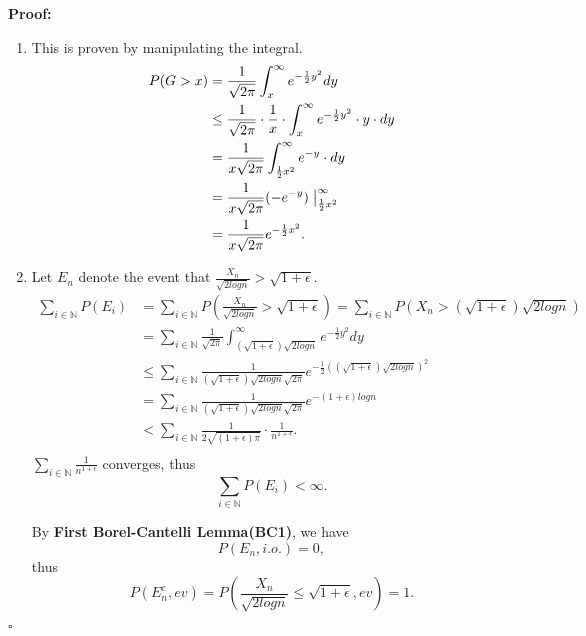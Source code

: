 \documentclass[UTF8, 12pt]{article}
\newenvironment{proof}{\noindent\ignorespaces\textbf{Proof:}}{\hfill $\square$\par\noindent}
\theoremstyle{break}
\begin{document}
    \begin{proof}
        \begin{enumerate}
            \item This is proven by manipulating the integral.
            \begin{align*}
                P(G > x) &= \frac{1}{\sqrt{2\pi}}\int_{x}^{\infty}e^{-\frac{1}{2}y^2}dy \\
                &\leq \frac{1}{\sqrt{2\pi}} \cdot \frac{1}{x} \cdot \int_{x}^{\infty}e^{-\frac{1}{2}y^2}\cdot y \cdot dy \\
                &= \frac{1}{x\sqrt{2\pi}} \int_{\frac{1}{2}x^2}^{\infty}e^{-y}\cdot dy \\
                &= \frac{1}{x\sqrt{2\pi}} (-e^{-y})\bigm|^{\infty}_{\frac{1}{2}x^2} \\
                &= \frac{1}{x\sqrt{2\pi}}e^{-\frac{1}{2}x^2}.
            \end{align*}

            \item Let $E_n$ denote the event that $\frac{X_n}{\sqrt{2logn}} > \sqrt{1 + \epsilon}$.
            \begin{align*}
                \sum_{i \in \mathbb{N}} P(E_i) &= \sum_{i \in \mathbb{N}} P(\frac{X_n}{\sqrt{2logn}} > \sqrt{1 + \epsilon}) = \sum_{i \in \mathbb{N}} P(X_n > (\sqrt{1 + \epsilon})\sqrt{2logn})\\
                &= \sum_{i \in \mathbb{N}} \frac{1}{\sqrt{2\pi}}\int_{ (\sqrt{1 + \epsilon})\sqrt{2logn} }^{\infty}e^{-\frac{1}{2}y^2}dy \\
                &\leq \sum_{i \in \mathbb{N}} \frac{1}{ (\sqrt{1 + \epsilon})\sqrt{2logn} \sqrt{2\pi}} e^{-\frac{1}{2}((\sqrt{1 + \epsilon})\sqrt{2logn})^2} \\
                &= \sum_{i \in \mathbb{N}} \frac{1}{ (\sqrt{1 + \epsilon})\sqrt{2logn} \sqrt{2\pi}} e^{-(1 + \epsilon)logn} \\
                &< \sum_{i \in \mathbb{N}} \frac{1}{ 2\sqrt{(1 + \epsilon)\pi}} \cdot \frac{1}{n ^ {1 + \epsilon}}. \\
            \end{align*}
            $\sum_{i \in \mathbb{N}} \frac{1}{n ^ {1 + \epsilon}}$ converges, thus $$  \sum_{i \in \mathbb{N}} P(E_i) < \infty. $$

            By \textbf{First Borel-Cantelli Lemma(BC1)}, we have $$ P(E_n, i.o.) = 0, $$
            thus $$ P(E_n^c,ev) = P(\frac{X_n}{\sqrt{2logn}} \leq \sqrt{1 + \epsilon}, ev) = 1. $$
            

\end{enumerate}
\end{proof}
\end{document}
